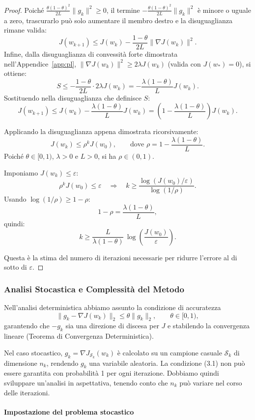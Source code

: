 \documentclass[a4paper,12pt]{article}
\begin{document}
\begin{proof}
  Poiché $\frac{\theta(1-\theta)^2}{2L}\|g_k\|^2 \ge 0$, il termine $-\frac{\theta(1-\theta)^2}{2L}\|g_k\|^2$ è minore o uguale a zero, trascurarlo può solo aumentare il membro destro e la disuguaglianza rimane valida:
  \[
  J(w_{k+1}) \le J(w_k) - \frac{1-\theta}{2L}\|\nabla J(w_k)\|^2.
  \]
  Infine, dalla disuguaglianza di convessità forte dimostrata nell'Appendice~\ref{app:pl},
$\|\nabla J(w_k)\|^2 \ge 2\lambda J(w_k)$ (valida con $J(w_*)=0$), si ottiene:
\[
S \le -\frac{1-\theta}{2L} \cdot 2\lambda J(w_k)
= -\frac{\lambda(1-\theta)}{L} J(w_k).
\]
Sostituendo nella disuguaglianza che definisce $S$:
\[
J(w_{k+1}) \le J(w_k) - \frac{\lambda(1-\theta)}{L} J(w_k)
= \left(1 - \frac{\lambda(1-\theta)}{L}\right) J(w_k).
\]

Applicando la disuguaglianza appena dimostrata ricorsivamente:
\[
J(w_k) \le \rho^k J(w_0), \qquad \text{dove } \rho = 1 - \frac{\lambda(1-\theta)}{L}.
\]
Poiché $\theta \in [0,1)$, $\lambda > 0$ e $L > 0$, si ha $\rho \in (0,1)$.

Imponiamo $J(w_k) \le \varepsilon$:
\[
\rho^k J(w_0) \le \varepsilon \quad\Longrightarrow\quad k \ge \frac{\log(J(w_0)/\varepsilon)}{\log(1/\rho)}.
\]
Usando $\log(1/\rho) \ge 1-\rho$:
\[
1 - \rho = \frac{\lambda(1-\theta)}{L},
\]
quindi:
\[
k \ge \frac{L}{\lambda(1-\theta)}\,\log\!\left(\frac{J(w_0)}{\varepsilon}\right).
\]

Questa è la stima del numero di iterazioni necessarie per ridurre l'errore al di sotto di $\varepsilon$.
\end{proof}
\subsubsection{Analisi Stocastica e Complessità del Metodo}

Nell'analisi deterministica abbiamo assunto la condizione di accuratezza
\[
\|g_k - \nabla J(w_k)\|_2 \le \theta \|g_k\|_2, \qquad \theta \in [0,1), \tag{3.1}
\]
garantendo che \(-g_k\) sia una direzione di discesa per \(J\) e stabilendo la convergenza lineare (Teorema di Convergenza Deterministica).

Nel caso stocastico, \(g_k = \nabla J_{\mathcal{S}_k}(w_k)\) è calcolato su un campione casuale \(\mathcal{S}_k\) di dimensione \(n_k\), rendendo \(g_k\) una variabile aleatoria. La condizione (3.1) non può essere garantita con probabilità 1 per ogni iterazione. Dobbiamo quindi sviluppare un'analisi in aspettativa, tenendo conto che \(n_k\) può variare nel corso delle iterazioni.

\paragraph{Impostazione del problema stocastico}
\end{document}
